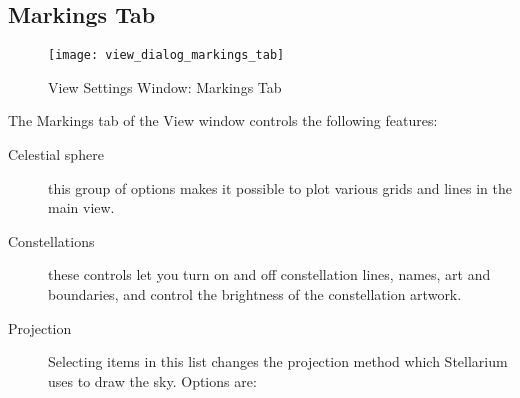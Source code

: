 \subsection{Markings Tab}
\label{sec:gui:view:markings}

\begin{figure}[t]
\centering\texttt{[image: view\_dialog\_markings\_tab]}
\caption{View Settings Window: Markings Tab}
\label{fig:gui:view:markings}
\end{figure}

The Markings tab of the View window controls the following features:

\begin{description}
\item[Celestial sphere] this group of options makes it possible to
  plot various grids and lines in the main view.
\item[Constellations] these controls let you turn on and off
  constellation lines, names, art and boundaries, and control the
  brightness of the constellation artwork.
\item[Projection] Selecting items in this list changes the
  projection method which Stellarium uses to draw the sky. Options are:


\end{description}
